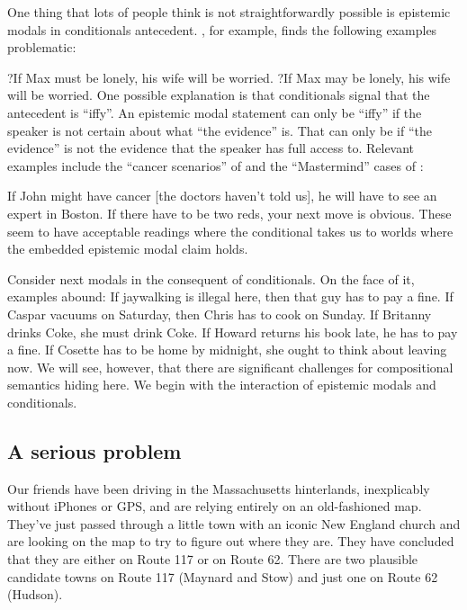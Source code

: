 One thing that lots of people think is not straightforwardly possible is
epistemic modals in conditionals antecedent. \cite{papafragou-2006-epistemic},
for example, finds the following examples problematic:

\pex
\a ?If Max must be lonely, his wife will be worried.
\a ?If Max may be lonely, his wife will be worried.
\xe
%
%
One possible explanation is that conditionals signal that the antecedent is
``iffy''. An epistemic modal statement can only be ``iffy'' if the speaker is
not certain about what ``the evidence'' is. That can only be if ``the evidence''
is not the evidence that the speaker has full access to. Relevant examples
include the ``cancer scenarios'' of \cite{derose-1991-epistemic} and the
``Mastermind'' cases of \cite{fintel-gillies-2007-ose2,fintel-gillies-2011-mmr}:
%

\pex
\a If John might have cancer [the doctors haven’t told us], he will have to see
an expert in Boston.
\a If there have to be two reds, your next move is obvious.
\xe
%
These seem to have acceptable readings where the conditional takes us to worlds
where the embedded epistemic modal claim holds.

Consider next modals in the consequent of conditionals. On the face of it,
examples abound:
%
%
\pex
\a If jaywalking is illegal here, then that guy has to pay a fine.
\a If Caspar vacuums on Saturday, then Chris has to cook on Sunday.
\a If Britanny drinks Coke, she must drink Coke.
\a If Howard returns his book late, he has to pay a fine.
\a If Cosette has to be home by midnight, she ought to think about leaving
now.
\xe
%
We will see, however, that there are significant challenges for compositional
semantics hiding here. We begin with the interaction of epistemic modals and
conditionals. 

\clearpage
\subsection{A serious problem}
\label{subsec:problem}

%
Our friends have been driving in the Massachusetts hinterlands, inexplicably
without iPhones or GPS, and are relying entirely on an old-fashioned map.
They've just passed through a little town with an iconic New England church and
are looking on the map to try to figure out where they are. They have concluded
that they are either on Route 117 or on Route 62. There are two plausible
candidate towns on Route 117 (Maynard and Stow) and just one on Route 62
(Hudson).

